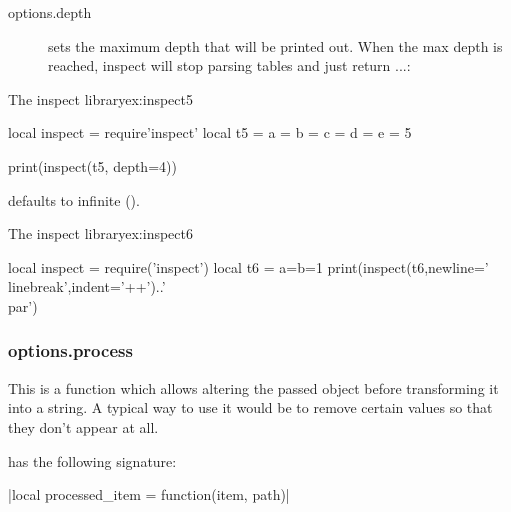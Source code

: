 \begin{description}
\item[options.depth] sets the maximum depth that will be printed out. When the max depth is reached, inspect will stop parsing tables and just return {...}:
\end{description}

\begin{texexample}{The inspect library}{ex:inspect5}
\begin{luacode}
local inspect = require'inspect'
local t5 = {a = {b = {c = {d = {e = 5}}}}}

print(inspect(t5, {depth=4}))
\end{luacode}
\end{texexample}

 defaults to infinite ().

\begin{texexample}{The inspect library}{ex:inspect6}
\begin{luacode}
local inspect = require('inspect')
local t6 = {a={b=1}}
print(inspect(t6,{newline='\\linebreak',indent='++'})..'\\par')
\end{luacode}
\end{texexample}

\subsubsection*{options.process}

This is a function which allows  altering the passed object before transforming it into a string. A typical way to use it would be to remove certain values so that they don't appear at all.

 has the following signature:

|local processed_item = function(item, path)|

